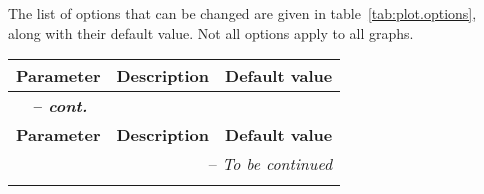 The list of options that can be changed are given in table~\ref{tab:plot.options}, along with their default value. Not all options apply to all graphs.
\begin{center}
\begin{longtable}{r p{8cm} p{3cm}}
\hline {\bf Parameter} & {\bf Description} & {\bf Default value}\\
\hline
\endfirsthead
\multicolumn{3}{l}{{\itshape \bfseries \tablename\ \thetable{} -- cont.}} \\
\hline {\bf Parameter} & {\bf Description} & {\bf Default value}\\
\hline
\endhead
\hline \multicolumn{3}{r}{{-- {\it To be continued}}} \\ 
\endfoot
\endlastfoot


\end{longtable}
\end{center}
